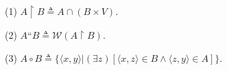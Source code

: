 (1) $A \upharpoonright B \triangleq A \cap (B \times V)$.

(2) $A“B \triangleq \mathcal{W}(A \upharpoonright B)$.

(3) $A \circ B \triangleq \{ \langle x, y \rangle | (\exists z)[\langle x, z \rangle \in B \wedge \langle z, y \rangle \in A]\}$.
